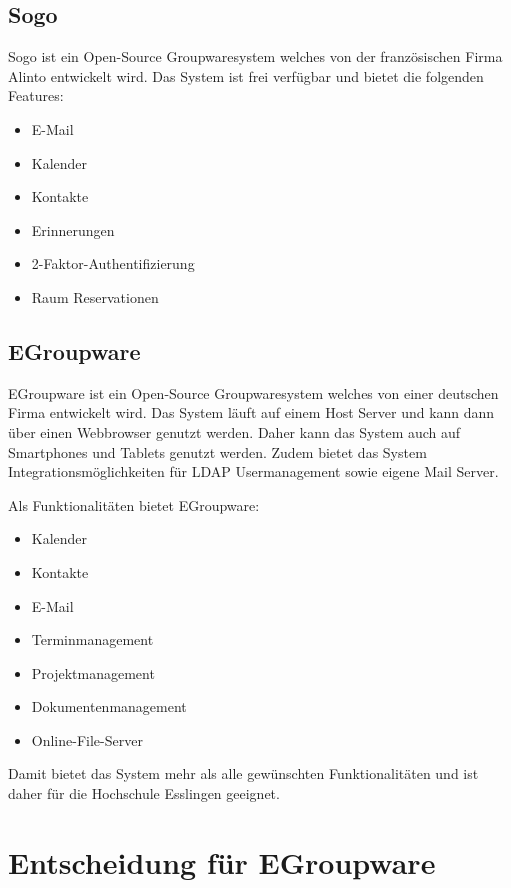 \subsection{Sogo}

Sogo ist ein Open-Source Groupwaresystem welches von der französischen Firma Alinto entwickelt wird.
Das System ist frei verfügbar und bietet die folgenden Features:

\begin{itemize}
    \item E-Mail
    \item Kalender
    \item Kontakte
    \item Erinnerungen
    \item 2-Faktor-Authentifizierung
    \item Raum Reservationen
\end{itemize}

\autocite{sogo}

\subsection{EGroupware}

EGroupware ist ein Open-Source Groupwaresystem welches von einer deutschen Firma entwickelt wird.
Das System läuft auf einem Host Server und kann dann über einen Webbrowser genutzt werden.
Daher kann das System auch auf Smartphones und Tablets genutzt werden.
Zudem bietet das System Integrationsmöglichkeiten für LDAP Usermanagement sowie eigene Mail Server.

Als Funktionalitäten bietet EGroupware:

\begin{itemize}
    \item Kalender
    \item Kontakte
    \item E-Mail
    \item Terminmanagement
    \item Projektmanagement
    \item Dokumentenmanagement
    \item Online-File-Server
\end{itemize}

Damit bietet das System mehr als alle gewünschten Funktionalitäten und ist daher für die Hochschule Esslingen geeignet.


\section{Entscheidung für EGroupware}

